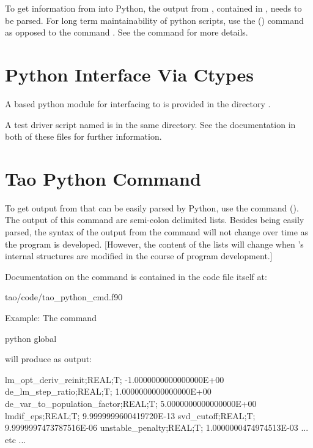 To get information from \tao into Python, the output from \tao,
contained in , needs to be parsed. For long term
maintainability of python scripts, use the  () command 
as opposed to the  command . See the  command for more details.

\section{Python Interface Via Ctypes}

A  based python module  for interfacing \tao to  is provided in
the directory .

A test driver script named  is in the same directory. See the documentation in both of
these files for further information.

\section{Tao Python Command}
\label{s:python.python}

To get output from \tao that can be easily parsed by Python, use the  command
(). The output of this command are semi-colon delimited lists. Besides being easily
parsed, the syntax of the output from the  command will not change over time as the \tao
program is developed. [However, the content of the lists will change when \tao's internal structures
are modified in the course of \tao program development.]

Documentation on the  command is contained in the code file itself at:
\begin{example}
  tao/code/tao_python_cmd.f90
\end{example}

Example: The command
\begin{example}
  python global
\end{example}
will produce as output:
\begin{example}
  lm_opt_deriv_reinit;REAL;T; -1.0000000000000000E+00
  de_lm_step_ratio;REAL;T;  1.0000000000000000E+00
  de_var_to_population_factor;REAL;T;  5.0000000000000000E+00
  lmdif_eps;REAL;T;  9.9999999600419720E-13
  svd_cutoff;REAL;T;  9.9999997473787516E-06
  unstable_penalty;REAL;T;  1.0000000474974513E-03
  ... etc ...
\end{example}

